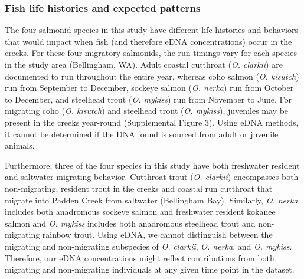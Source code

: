 \documentclass[
]{article}
\begin{document}
\hypertarget{fish-life-histories-and-expected-patterns}{%
\subsubsection{Fish life histories and expected
patterns}\label{fish-life-histories-and-expected-patterns}}

The four salmonid species in this study have different life histories
and behaviors that would impact when fish (and therefore eDNA
concentrations) occur in the creeks. For these four migratory salmonids,
the run timings vary for each species in the study area (Bellingham,
WA). Adult coastal cutthroat (\emph{O. clarkii}) are documented to run
throughout the entire year, whereas coho salmon (\emph{O. kisutch}) run
from September to December, sockeye salmon (\emph{O. nerka}) run from
October to December, and steelhead trout (\emph{O. mykiss}) run from
November to June. For migrating coho (\emph{O. kisutch}) and steelhead
trout (\emph{O. mykiss}), juveniles may be present in the creeks
year-round (Supplemental Figure 3). Using eDNA methods, it cannot be
determined if the DNA found is sourced from adult or juvenile animals.

Furthermore, three of the four species in this study have both
freshwater resident and saltwater migrating behavior. Cutthroat trout
(\emph{O. clarkii}) encompasses both non-migrating, resident trout in
the creeks and coastal run cutthroat that migrate into Padden Creek from
saltwater (Bellingham Bay). Similarly, \emph{O. nerka} includes both
anadromous sockeye salmon and freshwater resident kokanee salmon and
\emph{O. mykiss} includes both anadromous steelhead trout and
non-migrating rainbow trout. Using eDNA, we cannot distinguish between
the migrating and non-migrating subspecies of \emph{O. clarkii},
\emph{O. nerka}, and \emph{O. mykiss}. Therefore, our eDNA
concentrations might reflect contributions from both migrating and
non-migrating individuals at any given time point in the dataset.
\end{document}
